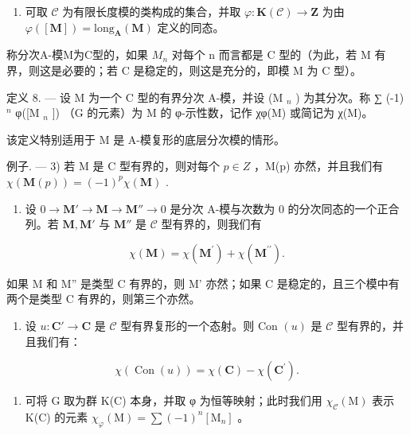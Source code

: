 \begin{enumerate}
\def\labelenumi{\arabic{enumi})}
\setcounter{enumi}{1}
\tightlist
\item
  可取 \(\mathcal{C}\) 为有限长度模的类构成的集合，并取 \(\varphi: \mathbf{K}(\mathcal{C}) \to \mathbf{Z}\) 为由 \(\varphi([\mathbf{M}]) = \text{long}_{\mathbf{A}}(\mathbf{M})\) 定义的同态。
\end{enumerate}

称分次A-模M为C型的，如果 \(M_{n}\) 对每个 n 而言都是 C 型的（为此，若 M 有界，则这是必要的；若 C 是稳定的，则这是充分的，即模 M 为 C 型）。

定义 8. --- 设 M 为一个 C 型的有界分次 A-模，并设 (M \(_{n}\) ) 为其分次。称 ∑ (-1) \(^{n}\) φ({[}M \(_{n}\) {]}) （G 的元素）为 M 的 φ-示性数，记作 χφ(M) 或简记为 χ(M)。

该定义特别适用于 M 是 A-模复形的底层分次模的情形。

例子. --- 3) 若 M 是 C 型有界的，则对每个 \(p \in Z\) ，M(p) 亦然，并且我们有 \(\chi(\mathbf{M}(p)) = (-1)^{p} \chi(\mathbf{M})\) .

\begin{enumerate}
\def\labelenumi{\arabic{enumi})}
\setcounter{enumi}{3}
\tightlist
\item
  设 \(0 \to \mathbf{M}' \to \mathbf{M} \to \mathbf{M}'' \to 0\) 是分次 A-模与次数为 0 的分次同态的一个正合列。若 \(\mathbf{M}, \mathbf{M}'\) 与 \(\mathbf{M}''\) 是 \(\mathcal{C}\) 型有界的，则我们有
\end{enumerate}

\[
\chi (\mathbf {M}) = \chi (\mathbf {M} ^ {\prime}) + \chi (\mathbf {M} ^ {\prime \prime}).
\]

如果 M 和 M'' 是类型 C 有界的，则 M' 亦然；如果 C 是稳定的，且三个模中有两个是类型 C 有界的，则第三个亦然。

\begin{enumerate}
\def\labelenumi{\arabic{enumi})}
\setcounter{enumi}{4}
\tightlist
\item
  设 \(u: \mathbf{C}' \to \mathbf{C}\) 是 \(\mathcal{C}\) 型有界复形的一个态射。则 Con \((u)\) 是 \(\mathcal{C}\) 型有界的，并且我们有：
\end{enumerate}

\[
\chi (\operatorname{Con} (u)) = \chi (\mathbf {C}) - \chi (\mathbf {C} ^ {\prime}).
\]

\begin{enumerate}
\def\labelenumi{\arabic{enumi})}
\setcounter{enumi}{5}
\tightlist
\item
  可将 G 取为群 K(C) 本身，并取 φ 为恒等映射；此时我们用 \(\chi_{\mathcal{C}}(\mathrm{M})\) 表示 K(C) 的元素 \(\chi_{\varphi}(\mathrm{M}) = \sum (-1)^{n}[\mathrm{M}_{n}]\) 。
\end{enumerate}

